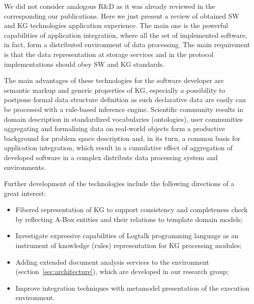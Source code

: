 \documentclass[
]{ceurart}
\begin{document}
We did not consider analogous R\&D as it was already reviewed in the corresponding our publications.  Here we just present a review of obtained SW and KG technologies application experience.  The main one is the powerful capabilities of application integration, where all the set of implemented software, in fact, form a distributed environment of data processing.  The main requirement is that the data representation at storage services and in the protocol implementations should obey SW and KG standards.

The main advantages of these technologies for the software developer are semantic markup and generic properties of KG, especially a possibility to postpone formal data structure definition as such declarative data are easily can be processed with a rule-based inference engine.  Scientific community results in domain description in standardized vocabularies (ontologies), user communities aggregating and formalizing data on real-world objects form a productive background for problem space description and,  in its turn, a common basis for application integration, which result in a cumulative effect of aggregation of developed software in a complex distribute data processing system and environments.

Further development of the technologies include the following directions of a great interest:
\begin{itemize}
\item Fibered representation of KG to support consistency and completeness check by reflecting A-Box entities and their relations to template domain models;
\item Investigate expressive capabilities of Logtalk programming language as an instrument of knowledge (rules) representation for KG processing modules;
\item Adding extended document analysis services \cite{shigpaper} to the environment (section~\ref{sec:architecture}), which are developed in our research group;
\item Improve integration techniques with metamodel presentation of the execution environment.
\end{itemize}
\end{document}
